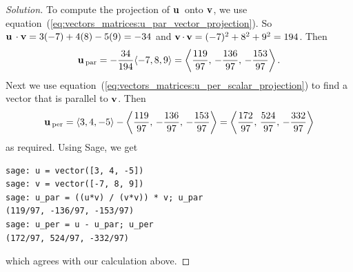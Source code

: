 \begin{proof}[Solution]
To compute the projection of $\operatorname*{\mathbf{u}}{}$ onto $\operatorname*{\mathbf{v}}$, we use
equation~(\ref{eq:vectors_matrices:u_par_vector_projection}). So
$\operatorname*{\mathbf{u}}{} \cdot \operatorname*{\mathbf{v}} = 3(-7) + 4(8) - 5(9) = -34$ and
$\operatorname*{\mathbf{v}} \cdot \operatorname*{\mathbf{v}} = (-7)^2 + 8^2 + 9^2 = 194$. Then
\[
\operatorname*{\mathbf{u}}{}_{\text{par}}
=
-\frac{34}{194} \langle -7, 8, 9 \rangle
=
\left\langle
\frac{119}{97},\, -\frac{136}{97},\, -\frac{153}{97}
\right\rangle.
\]
Next we use
equation~(\ref{eq:vectors_matrices:u_per_scalar_projection}) to find a
vector that is parallel to $\operatorname*{\mathbf{v}}$. Then
\[
\operatorname*{\mathbf{u}}{}_{\text{per}}
=
\langle 3, 4, -5 \rangle -
\left\langle
\frac{119}{97},\, -\frac{136}{97},\, -\frac{153}{97}
\right\rangle
=
\left\langle
\frac{172}{97},\, \frac{524}{97},\, -\frac{332}{97}
\right\rangle
\]
as required. Using Sage, we get
%
\begin{lstlisting}
sage: u = vector([3, 4, -5])
sage: v = vector([-7, 8, 9])
sage: u_par = ((u*v) / (v*v)) * v; u_par
(119/97, -136/97, -153/97)
sage: u_per = u - u_par; u_per
(172/97, 524/97, -332/97)
\end{lstlisting}
%
which agrees with our calculation above.
\end{proof}
